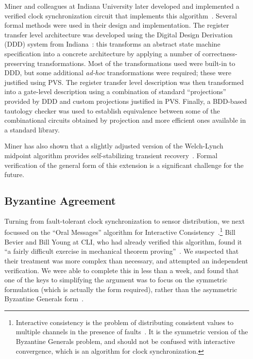 Miner and colleagues at Indiana University later developed and
implemented a verified clock synchronization circuit that implements
this algorithm~\cite{Miner94:circuit}.  Several formal methods were
used in their design and implementation.  The register transfer level
architecture was developed using the Digital Design Derivation (DDD)
system from Indiana~\cite{Bose91:DDD}: this transforms an abstract
state machine specification into a concrete architecture by applying
a number of correctness-preserving transformations.  Most of the
transformations used were built-in to DDD, but some additional {\em
ad-hoc} transformations were required; these were justified using
PVS\@.  The register transfer level description was then transformed
into a gate-level description using a combination of standard
``projections'' provided by DDD and custom projections justified in
PVS\@.  Finally, a BDD-based tautology checker was used to establish
equivalence between some of the combinational circuits obtained by
projection and more efficient ones available in a standard library.

Miner has also shown that a slightly adjusted version of the
Welch-Lynch midpoint algorithm provides self-stabilizing transient
recovery~\cite[chapter 6]{Miner93}.  Formal verification of the
general form of this extension is a significant challenge for the
future.

\subsection{Byzantine Agreement}

Turning from fault-tolerant clock synchronization to sensor
distribution, we next focussed on the ``Oral Messages'' algorithm for
Interactive
Consistency~\cite{Lamport:Byzantine}.\footnote{Interactive
consistency is the problem of distributing consistent values to
multiple channels in the presence of faults~\cite{Pease}.  It is the
symmetric version of the Byzantine Generals problem, and should not
be confused with interactive convergence, which is an algorithm for
clock synchronization.} Bill Bevier and Bill Young at CLI, who had already
verified this algorithm, found it ``a fairly difficult exercise in
mechanical theorem proving''~\cite{OM-proof}.  We suspected that
their treatment was more complex than necessary, and attempted an
independent verification.  We were able to complete this in less than
a week, and found that one of the keys to simplifying the argument
was to focus on the symmetric formulation (which is actually the form
required), rather than the asymmetric Byzantine Generals
form~\cite{Rushby92:OM}.

